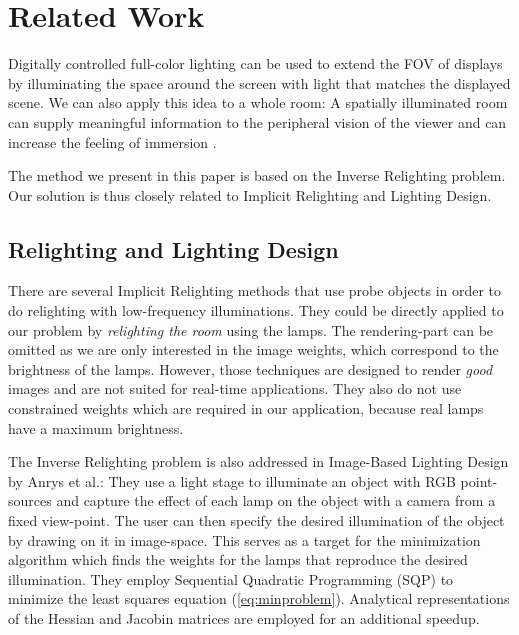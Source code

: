 

\chapter{Related Work}

 
 Digitally controlled full-color lighting can be used to extend the FOV of displays by illuminating the space around the screen with light that matches the displayed scene.
 We can also apply this idea to a whole room: A spatially illuminated room can supply meaningful information to the peripheral vision of the viewer and 
 can increase the feeling of immersion \cite{ghosh2005real}.
 
 The method we present in this paper is based on the Inverse Relighting problem. 
 Our solution is thus closely related to Implicit Relighting and Lighting Design.
    
\section{Relighting and Lighting Design}
 
 There are several Implicit Relighting methods \cite{matusik2004progressively} \cite{fuchs2005bayesian} that use probe objects in order to do relighting with low-frequency illuminations.
 They could be directly applied to our problem by \emph{relighting the room} using the lamps.
 The rendering-part can be omitted as we are only interested in the image weights, which correspond to the brightness of the lamps.
 However, those techniques are designed to render \emph{good} images and are not suited for real-time applications.    
 They also do not use constrained weights which are required in our application, because real lamps have a maximum brightness.
 
 The Inverse Relighting problem is also addressed in Image-Based Lighting Design \cite{anrys2004image} by Anrys et al.:
 They use a light stage to illuminate an object with RGB point-sources and capture the effect of each lamp on the object with a camera from a fixed view-point. 
 The user can then specify the desired illumination of the object by drawing on it in image-space. 
 This serves as a target for the minimization algorithm which finds the weights for the lamps that reproduce the desired illumination. 
 They employ Sequential Quadratic Programming (SQP) to minimize the least squares equation (\ref{eq:minproblem}).
 Analytical representations of the Hessian and Jacobin matrices are employed for an additional speedup.
  
